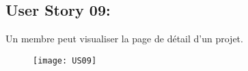 \newpage
\subsection{User Story 09:}
Un membre peut visualiser la page de détail d'un projet.

\begin{figure}[!h]
  \begin{center}
        \texttt{[image: US09]}
        \label{US09-dia}
  \end{center}
\end{figure}